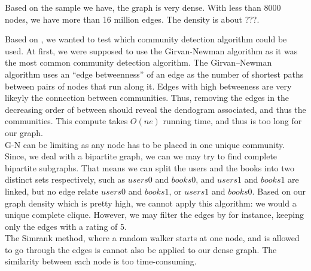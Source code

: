 \documentclass[11pt]{article}
\begin{document}
Based on the sample we have, the graph is very dense.
With less than 8000 nodes, we have more than 16 million edges. The density is about ???.

Based on \cite{mining_massive_dataset}, we wanted to test which community detection algorithm could be used.
At first, we were supposed to use the Girvan-Newman algorithm as it was the most common community detection algorithm\cite{newman}.
The Girvan–Newman algorithm uses an ``edge betweenness'' of an edge as the number of shortest paths between pairs of nodes that run along it.
Edges with high betweeness are very likeyly the connection between communities.
Thus, removing the edges in the decreasing order of between should reveal the dendogram associated, and thus the communities.
This compute takes $O(ne)$ running time, and thus is too long for our graph.\\

G-N can be limiting as any node has to be placed in one unique community.
Since, we deal with a bipartite graph, we can we may try to find complete bipartite subgraphs.
That means we can split the users and the books into two distinct sets respectively, such as $users0$ and $books0$, and $users1$ and $books1$ are linked, but no edge relate $users0$ and $books1$, or $users1$ and $books0$.
Based on our graph density which is pretty high, we cannot apply this algorithm: we would a unique complete clique.
However, we may filter the edges by for instance, keeping only the edges with a rating of 5.\\

The Simrank method, where a random walker starts at one node, and is allowed to go through the edges is cannot also be applied to our dense graph.
The similarity between each node is too time-consuming. 

\end{document}
